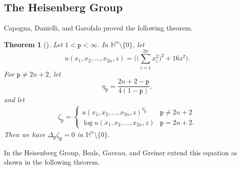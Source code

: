 \documentclass[12pt]{amsart}
\theoremstyle{plain}
\newtheorem{theorem}{Theorem}[section]
\theoremstyle{definition}
\numberwithin{equation}{section}
\begin{document}
\subsection{The Heisenberg Group}
Capogna, Danielli, and Garofalo \cite{CDG} proved the following theorem.
\begin{theorem}[\cite{CDG}]\label{T8}
Let $1<{\texttt{p}}<\infty$. In $\mathbb{H}^n \setminus {\{0}\}$, let $$u(x_1,x_2,\ldots, x_{2n},z)=\Bigg(\bigg(\sum_{i=1}^{2n}x_i^2\bigg)^2+16z^2\Bigg).$$ For ${\texttt{p}} \neq 2n+2$, let $$\eta_{\texttt{p}}=\frac{2n+2-{\texttt{p}}}{4(1-{\texttt{p}})},$$ and let
\begin{eqnarray*}
\zeta_{\texttt{p}}=\left\{\begin{array}{cc}
u(x_1,x_2,\ldots, x_{2n},z)^{\eta_{\texttt{p}}} & {\texttt{p}} \neq 2n+2 \\
\log u(x_1,x_2,\ldots, x_{2n},z) & {\texttt{p}} = 2n+2.
\end{array}\right.
\end{eqnarray*}
Then we have $\Delta_{\texttt{p}}\zeta_{\texttt{p}}=0$ in $\mathbb{H}^n \setminus {\{0}\}$.
\end{theorem}

In the Heisenberg Group, Beals, Gaveau, and Greiner \cite{BGG} extend this equation as shown in the following theorem. 
\end{document}
